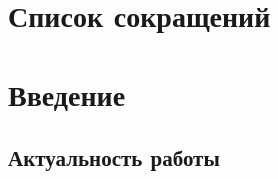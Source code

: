 \documentclass[a4paper,portrait,12pt]{article}
\begin{document}
\section*{\textbf{Список сокращений}}













\newpage



\section*{\textbf{Введение}}

\subsection*{\textbf{Актуальность работы}}
\end{document}
